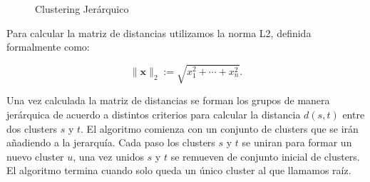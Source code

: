 \begin{figure}[htbp]
  \centering
  
    \caption{Clustering Jerárquico}
    \label{fig:hierarchy}
\end{figure}







Para calcular la matriz de distancias utilizamos la norma L2, definida formalmente como:

$${\displaystyle \|{\boldsymbol {x}}\|_{2}:={\sqrt {x_{1}^{2}+\cdots +x_{n}^{2}}}.}$$

Una vez calculada la matriz de distancias se forman los grupos de manera jerárquica de acuerdo a distintos criterios para calcular la distancia $d(s,t)$ entre dos clusters $s$ y $t$. El algoritmo comienza con un conjunto de clusters que se irán añadiendo a la jerarquía. Cada paso los clusters $s$ y $t$ se uniran para formar un nuevo cluster $u$, una vez unidos $s$ y $t$ se remueven de conjunto inicial de clusters. El algoritmo termina cuando solo queda un único cluster al que llamamos raíz.

